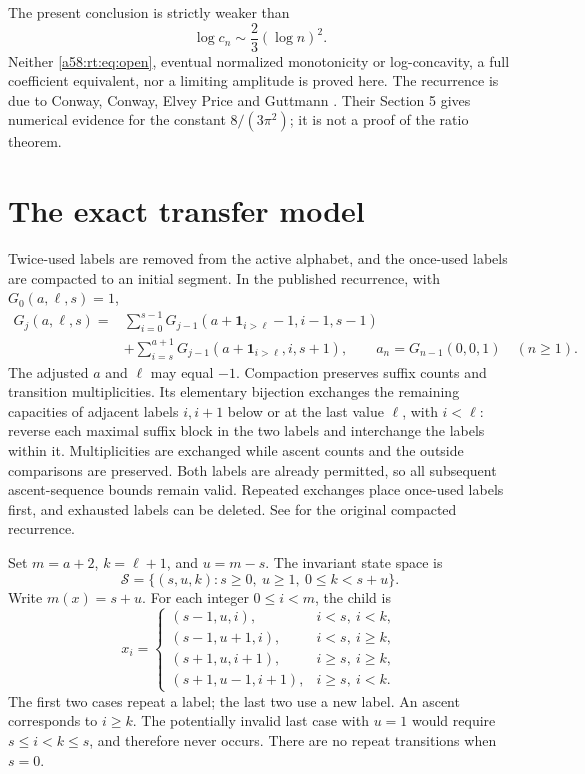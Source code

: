 \documentclass[11pt,letterpaper]{article}
\theoremstyle{remark}
\newcommand{\one}{\mathbf 1}
\newcommand{\Sstate}{\mathcal S}
\begin{document}
The present conclusion is strictly weaker than
\begin{equation}\label{a58:rt:eq:open}
 \log c_n\sim\frac23(\log n)^2.
\end{equation}
Neither \eqref{a58:rt:eq:open}, eventual normalized monotonicity or log-concavity,
a full coefficient equivalent, nor a limiting amplitude is proved here.
The recurrence is due to Conway, Conway, Elvey Price and Guttmann
\cite[Sections 2.2 and 2.6]{CCEG}. Their Section 5 gives numerical evidence
for the constant $8/(3\pi^2)$; it is not a proof of the ratio theorem.

\section{The exact transfer model}\label{a58:rt:sec:transfer}
Twice-used labels are removed from the active alphabet, and the
once-used labels are compacted to an initial segment. In the published
recurrence, with $G_0(a,\ell,s)=1$,
\begin{align*}
 G_j(a,\ell,s)={}&\sum_{i=0}^{s-1}
 G_{j-1}(a+\one_{i>\ell}-1,i-1,s-1)\\
 &+\sum_{i=s}^{a+1}G_{j-1}(a+\one_{i>\ell},i,s+1),
 \qquad a_n=G_{n-1}(0,0,1)\quad(n\ge1).
\end{align*}
The adjusted $a$ and $\ell$ may equal $-1$. Compaction preserves suffix
counts and transition multiplicities. Its elementary bijection exchanges
the remaining capacities of adjacent labels $i,i+1$ below or at the
last value $\ell$, with $i<\ell$: reverse each maximal suffix block in the two labels and interchange
the labels within it. Multiplicities are exchanged while ascent counts
and the outside comparisons are preserved. Both labels are already
permitted, so all subsequent ascent-sequence bounds remain valid.
Repeated exchanges place once-used labels first, and exhausted labels
can be deleted. See \cite{CCEG} for the original compacted recurrence.

Set $m=a+2$, $k=\ell+1$, and $u=m-s$. The invariant state space is
\[
 \Sstate=\{(s,u,k):s\ge0,\ u\ge1,\ 0\le k<s+u\}.
\]
Write $m(x)=s+u$. For each integer $0\le i<m$, the child is
\begin{equation}\label{a58:rt:eq:children}
 x_i=\begin{cases}
 (s-1,u,i),&i<s,\ i<k,\\
 (s-1,u+1,i),&i<s,\ i\ge k,\\
 (s+1,u,i+1),&i\ge s,\ i\ge k,\\
 (s+1,u-1,i+1),&i\ge s,\ i<k.
 \end{cases}
\end{equation}
The first two cases repeat a label; the last two use a new label.
An ascent corresponds to $i\ge k$. The potentially invalid last case
with $u=1$ would require $s\le i<k\le s$, and therefore never occurs.
There are no repeat transitions when $s=0$.
\end{document}
